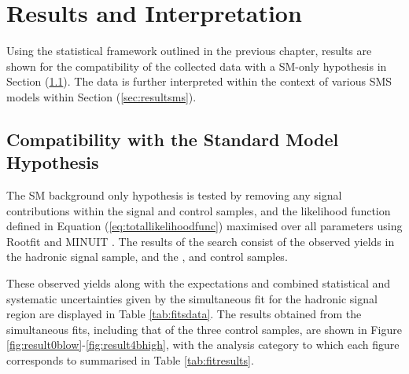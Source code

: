 \chapter{Results and Interpretation}
\label{chap:SUSYresults}

Using the statistical framework outlined in the previous chapter, results are shown for the compatibility of the collected data with a \ac{SM}-only hypothesis in Section (\ref{sec:smhypothesis}). The data is further interpreted within the context of various \ac{SMS} models within Section (\ref{sec:resultsms}). 

\section{Compatibility with the Standard Model Hypothesis}
\label{sec:smhypothesis}

The \ac{SM} background only hypothesis is tested by removing any signal contributions within the signal and control samples, and the likelihood function defined in Equation (\ref{eq:totallikelihoodfunc}) maximised over all parameters using Rootfit \cite{2010acat.confE..57M} and MINUIT \cite{James:1975dr}. The results of the search consist of the observed yields in the hadronic signal sample, and the \mupjets, \dimupjets and \gpjets control samples. 

These observed yields along with the expectations and combined statistical and systematic uncertainties given by the simultaneous fit for the hadronic signal region are displayed in Table \ref{tab:fitsdata}. The results obtained from the simultaneous fits, including that of the three control samples, are shown in Figure \ref{fig:result0blow}-\ref{fig:result4bhigh}, with the analysis category to which each figure corresponds to summarised in Table \ref{tab:fitresults}. 

